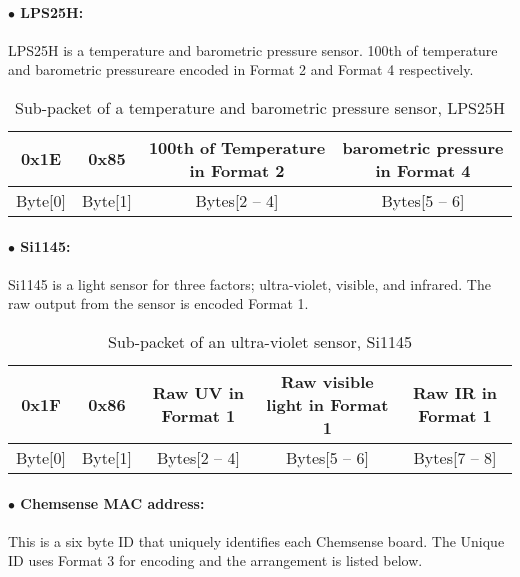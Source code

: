 \paragraph{$\bullet$ LPS25H:}

LPS25H is a temperature and barometric pressure sensor. 100th of temperature and barometric pressureare
encoded in Format 2 and Format 4 respectively.

\begin{table}[h!]
    \centering
    \caption{Sub-packet of a temperature and barometric pressure sensor, LPS25H}
    \begin{tabular}{|c|c|c|c|}
        \hline
        \rowcolor{black!8}
        \textbf{0x1E} & \textbf{0x85} & \textbf{100th of Temperature in Format 2} & \textbf{barometric pressure in Format 4}\\
        \hline
        Byte[0] & Byte[1] & Bytes[2 -- 4] & Bytes[5 -- 6] \\ \hline
    \end{tabular}
\end{table}


\paragraph{$\bullet$ Si1145:}
Si1145 is a light sensor for three factors; ultra-violet, visible, and infrared. 
The raw output from the sensor is encoded Format 1.

\begin{table}[h!]
    \centering
    \caption{Sub-packet of an ultra-violet sensor, Si1145}
    \begin{tabular}{|c|c|c|c|c|}
        \hline
        \rowcolor{black!8}
        \textbf{0x1F} & \textbf{0x86} & \textbf{Raw UV in Format 1} & \textbf{Raw visible light in Format 1} & \textbf{Raw IR in Format 1}\\
        \hline
        Byte[0] & Byte[1] & Bytes[2 -- 4] & Bytes[5 -- 6] & Bytes[7 -- 8] \\ \hline
    \end{tabular}
\end{table}


\paragraph{$\bullet$ Chemsense MAC address:}

This is a six byte ID that uniquely identifies each Chemsense board. The Unique ID uses Format 3
for encoding and the arrangement is listed below.


